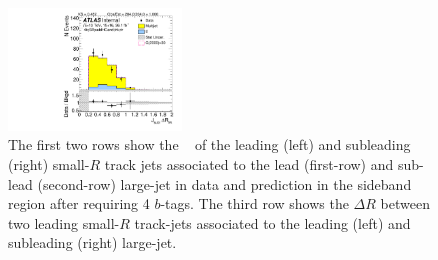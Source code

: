 \begin{figure}[htb!]
\begin{center}
\includegraphics[width=0.41\textwidth,angle=-90]{figures/boosted/Sideband/b77_FourTag_Sideband_sublHCand_trk_dr.pdf}
  \caption{The first two rows show the \pt~ of the leading (left) and subleading (right) small-$R$ track jets associated to the lead (first-row) and sub-lead (second-row) large-\R jet in data and prediction in the sideband region after requiring 4 $b$-tags. The third row shows the $\Delta R$ between two leading small-$R$ track-jets associated to the leading (left) and subleading (right) large-\R jet. }
  \label{fig:boosted-4b-sideband-ak2}
\end{center}
\end{figure}


